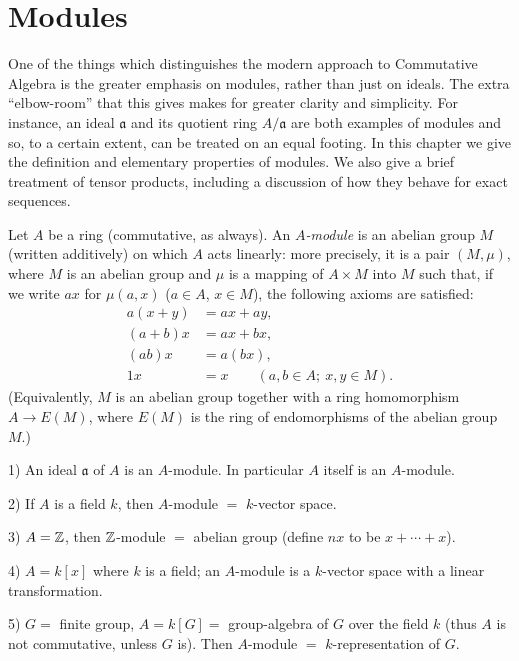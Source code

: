 \chapter{Modules}\label{chapter2}

One of the things which distinguishes the modern approach to Commutative Algebra is the greater emphasis on modules, rather than just on ideals. The extra ``elbow-room'' that this gives makes for greater clarity and simplicity. For instance, an ideal $\mathfrak{a}$ and its quotient ring $A/\mathfrak{a}$ are both examples of modules and so, to a certain extent, can be treated on an equal footing. In this chapter we give the definition and elementary properties of modules. We also give a brief treatment of tensor products, including a discussion of how they behave for exact sequences.


Let $A$ be a ring (commutative, as always). An \emph{$A$-module} is an abelian group $M$ (written additively) on which $A$ acts linearly: more precisely, it is a pair $(M,\mu)$, where $M$ is an abelian group and $\mu$ is a mapping of $A \times M$ into $M$ such that, if we write $ax$ for $\mu(a, x)$ ($a \in A$, $x \in M$), the following axioms are satisfied:
\begin{align*}
    a(x + y) &= ax + ay, \\
    (a + b)x &= ax + bx, \\
    (ab)x &= a(bx), \\
    1x &= x \qquad (a, b \in A;\ x, y \in M).
\end{align*}
(Equivalently, $M$ is an abelian group together with a ring homomorphism $A\to E(M)$, where $E(M)$ is the ring of endomorphisms of the abelian group $M$.)

\begin{examples}
1) An ideal $\mathfrak{a}$ of $A$ is an $A$-module. In particular $A$ itself is an $A$-module.

2) If $A$ is a field $k$, then $A$-module $=$ $k$-vector space.

3) $A = \mathbb{Z}$, then $\mathbb{Z}$-module $=$ abelian group (define $nx$ to be $x + \cdots + x$).

4) $A = k[x]$ where $k$ is a field; an $A$-module is a $k$-vector space with a linear transformation.

5) $G =$ finite group, $A = k[G] =$ group-algebra of $G$ over the field $k$ (thus $A$ is not commutative, unless $G$ is). Then $A$-module $=$ $k$-representation of $G$.
\end{examples}

